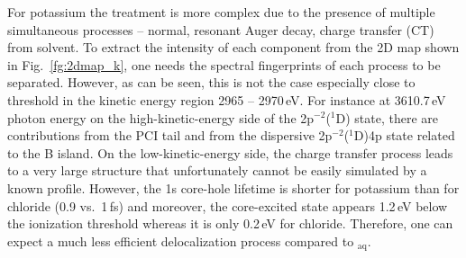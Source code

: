 For potassium the treatment is more complex due to the presence of multiple simultaneous processes -- normal, resonant Auger decay, charge transfer (CT) from solvent. To extract the intensity of each component from the 2D map shown in Fig.\ \ref{fg:2dmap_k}, one needs the spectral fingerprints of each process to be separated. However, as can be seen, this is not the case especially close to threshold in the kinetic energy region 2965 -- 2970\,eV. For instance at 3610.7\,eV photon energy on the high-kinetic-energy side of the 2p$^{-2}$($^1$D) state, there are contributions from the PCI tail and from the dispersive 2p$^{-2}$($^1$D)4p state related to the B island. On the low-kinetic-energy side, the charge transfer process leads to a very large structure that unfortunately cannot be easily simulated by a known profile. However, the 1s core-hole lifetime is shorter for potassium than for chloride (0.9 vs.\ 1\,fs) and moreover, the core-excited state appears 1.2\,eV below the ionization threshold whereas it is only 0.2\,eV for chloride. Therefore, one can expect a much less efficient delocalization process compared to \cli$_{\text{aq}}$.

